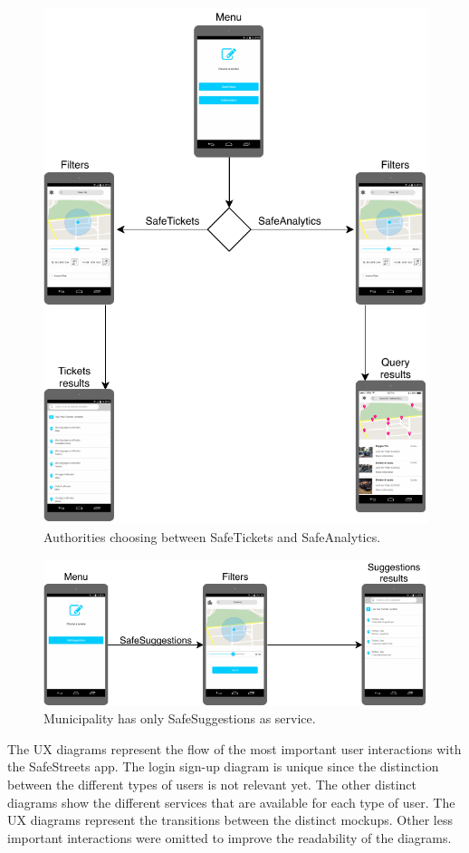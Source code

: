 \documentclass[./main.tex]{subfiles}
\begin{document}
\begin{figure}[H]
\centering
\includegraphics[]{resources/UXflow/aux}
\caption{Authorities choosing between SafeTickets and SafeAnalytics.}
\end{figure}

\begin{figure}[H]
\centering
\includegraphics[width = \textwidth]{resources/UXflow/mux}
\caption{Municipality has only SafeSuggestions as service.}
\end{figure}

The UX diagrams represent the flow of the most important user interactions with the SafeStreets app. The login sign-up diagram is unique since the distinction between the different types of users is not relevant yet. The other distinct diagrams show the different services that are available for each type of user. The UX diagrams represent the transitions between the distinct mockups. 
Other less important interactions were omitted to improve the readability of the diagrams.
\end{document}
